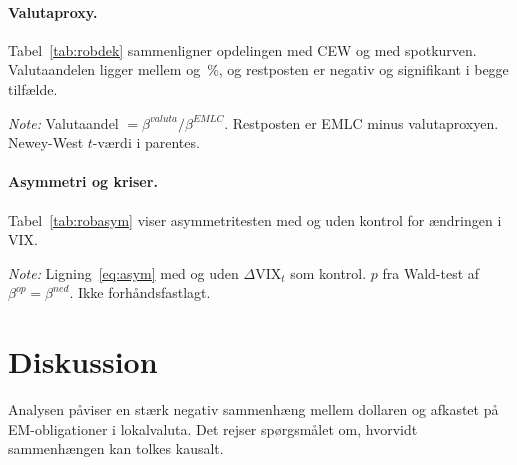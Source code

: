 \documentclass[11pt,a4paper]{article}
\begin{document}
\paragraph{Valutaproxy.} Tabel~\ref{tab:robdek} sammenligner opdelingen med CEW og med spotkurven. Valutaandelen ligger mellem \AndelMin{} og \AndelMax\,\%, og restposten er negativ og signifikant i begge tilfælde.

\begin{table}[!htb]
\centering
\small
\begin{threeparttable}
\caption{Opdeling med to valutaproxyer}
\label{tab:robdek}

\begin{tablenotes}\footnotesize
\item \textit{Note:} Valutaandel $=\beta^{valuta}/\beta^{EMLC}$. Restposten er EMLC minus valutaproxyen. Newey-West $t$-værdi i parentes.
\end{tablenotes}
\end{threeparttable}
\end{table}

\paragraph{Asymmetri og kriser.} Tabel~\ref{tab:robasym} viser asymmetritesten med og uden kontrol for ændringen i VIX.

\begin{table}[!htb]
\centering
\small
\begin{threeparttable}
\caption{Asymmetri med kontrol for VIX (eksplorativt)}
\label{tab:robasym}

\begin{tablenotes}\footnotesize
\item \textit{Note:} Ligning~\eqref{eq:asym} med og uden $\Delta\mathrm{VIX}_t$ som kontrol. $p$ fra Wald-test af $\beta^{op}=\beta^{ned}$. Ikke forhåndsfastlagt.
\end{tablenotes}
\end{threeparttable}
\end{table}

\section{Diskussion}

Analysen påviser en stærk negativ sammenhæng mellem dollaren og afkastet på EM-obligationer i lokalvaluta. Det rejser spørgsmålet om, hvorvidt sammenhængen kan tolkes kausalt.
\end{document}
